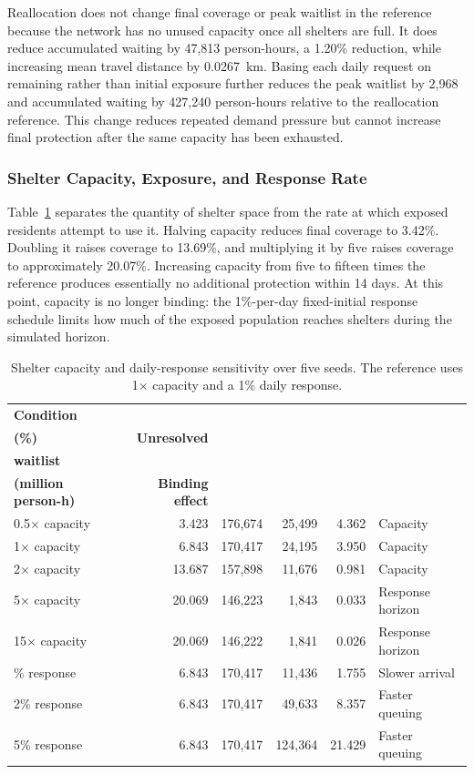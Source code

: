Reallocation does not change final coverage or peak waitlist in the reference because the network has no unused capacity once all shelters are full. It does reduce accumulated waiting by 47,813 person-hours, a 1.20\% reduction, while increasing mean travel distance by 0.0267~km. Basing each daily request on remaining rather than initial exposure further reduces the peak waitlist by 2,968 and accumulated waiting by 427,240 person-hours relative to the reallocation reference. This change reduces repeated demand pressure but cannot increase final protection after the same capacity has been exhausted.

\subsubsection{Shelter Capacity, Exposure, and Response Rate}

Table~\ref{tbl:shelter_capacity_response} separates the quantity of shelter space from the rate at which exposed residents attempt to use it. Halving capacity reduces final coverage to 3.42\%. Doubling it raises coverage to 13.69\%, and multiplying it by five raises coverage to approximately 20.07\%. Increasing capacity from five to fifteen times the reference produces essentially no additional protection within 14 days. At this point, capacity is no longer binding: the 1\%-per-day fixed-initial response schedule limits how much of the exposed population reaches shelters during the simulated horizon.

\begin{table}[ht]
\centering
\footnotesize
\caption{Shelter capacity and daily-response sensitivity over five seeds. The reference uses 1$\times$ capacity and a 1\% daily response.}
\label{tbl:shelter_capacity_response}
\begin{tabularx}{\linewidth}{@{}lrrrrX@{}}
\toprule
\textbf{Condition} &
\shortstack{\textbf{Coverage}\\\textbf{(\%)}} &
\textbf{Unresolved} &
\shortstack{\textbf{Peak}\\\textbf{waitlist}} &
\shortstack{\textbf{Waiting}\\\textbf{(million person-h)}} &
\textbf{Binding effect} \\
\midrule
0.5$\times$ capacity & 3.423 & 176,674 & 25,499 & 4.362 & Capacity \\
1$\times$ capacity  & 6.843 & 170,417 & 24,195 & 3.950 & Capacity \\
2$\times$ capacity  & 13.687 & 157,898 & 11,676 & 0.981 & Capacity \\
5$\times$ capacity  & 20.069 & 146,223 & 1,843 & 0.033 & Response horizon \\
15$\times$ capacity & 20.069 & 146,222 & 1,841 & 0.026 & Response horizon \\
\addlinespace
0.5\% response & 6.843 & 170,417 & 11,436 & 1.755 & Slower arrival \\
2\% response   & 6.843 & 170,417 & 49,633 & 8.357 & Faster queuing \\
5\% response   & 6.843 & 170,417 & 124,364 & 21.429 & Faster queuing \\
\bottomrule
\end{tabularx}
\end{table}

